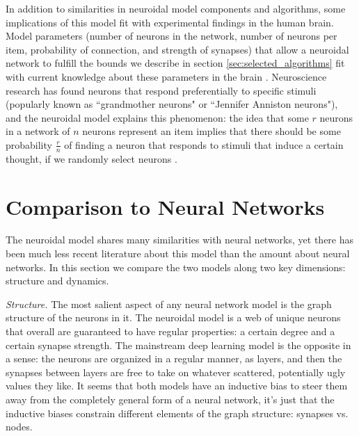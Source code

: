 \documentclass[letterpaper, 12pt]{article}
\begin{document}
In addition to similarities in neuroidal model components and algorithms, some implications of this model fit with experimental findings in the human brain. Model parameters (number of neurons in the network, number of neurons per item, probability of connection, and strength of synapses) that allow a neuroidal network to fulfill the bounds we describe in section \ref{sec:selected_algorithms} fit with current knowledge about these parameters in the brain \cite{valiant_memorization_2005, valiant_quantitative_2006}. Neuroscience research has found neurons that respond preferentially to specific stimuli (popularly known as ``grandmother neurons" or ``Jennifer Anniston neurons"), and the neuroidal model explains this phenomenon: the idea that some $r$ neurons in a network of $n$ neurons represent an item implies that there should be some probability $\frac{r}{n}$ of finding a neuron that responds to stimuli that induce a certain thought, if we randomly select neurons \cite{quiroga_invariant_2005, valiant_quantitative_2006}.

\section{Comparison to Neural Networks}
The neuroidal model shares many similarities with neural networks, yet there has been much less recent literature about this model than the amount about neural networks. In this section we compare the two models along two key dimensions: structure and dynamics. 

{\it Structure.} The most salient aspect of any neural network model is the graph structure of the neurons in it. The neuroidal model is a web of unique neurons that overall are guaranteed to have regular properties: a certain degree and a certain synapse strength. The mainstream deep learning model is the opposite in a sense: the neurons are organized in a regular manner, as layers, and then the synapses between layers are free to take on whatever scattered, potentially ugly values they like. It seems that both models have an inductive bias to steer them away from the completely general form of a neural network, it's just that the inductive biases constrain different elements of the graph structure: synapses vs. nodes.
\end{document}
